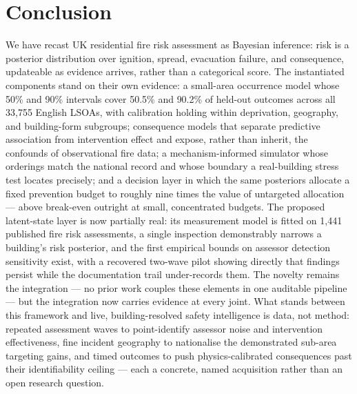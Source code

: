 \section{Conclusion}
\label{sec:conclusion}

We have recast UK residential fire risk assessment as Bayesian inference: risk is a
posterior distribution over ignition, spread, evacuation failure, and consequence,
updateable as evidence arrives, rather than a categorical score. The instantiated
components stand on their own evidence: a small-area occurrence model whose 50\%
and 90\% intervals cover 50.5\% and 90.2\% of held-out outcomes across all
33{,}755 English LSOAs, with calibration holding within deprivation, geography, and
building-form subgroups; consequence models that separate predictive association
from intervention effect and expose, rather than inherit, the confounds of
observational fire data; a mechanism-informed simulator whose orderings match the
national record and whose boundary a real-building stress test locates precisely;
and a decision layer in which the same posteriors allocate a fixed prevention
budget to roughly nine times the value of untargeted allocation --- above
break-even outright at small, concentrated budgets. The proposed latent-state
layer is now partially real: its measurement model is fitted on 1{,}441 published
fire risk assessments, a single inspection demonstrably narrows a building's risk
posterior, and the first empirical bounds on assessor detection sensitivity exist,
with a recovered two-wave pilot showing directly that findings persist while the
documentation trail under-records them. The novelty remains the integration ---
no prior work couples these elements in one auditable pipeline --- but the
integration now carries evidence at every joint. What stands between this
framework and live, building-resolved safety intelligence is data, not method:
repeated assessment waves to point-identify assessor noise and intervention
effectiveness, fine incident geography to nationalise the demonstrated sub-area
targeting gains, and timed outcomes to push physics-calibrated consequences past
their identifiability ceiling --- each a concrete, named acquisition rather than
an open research question.
